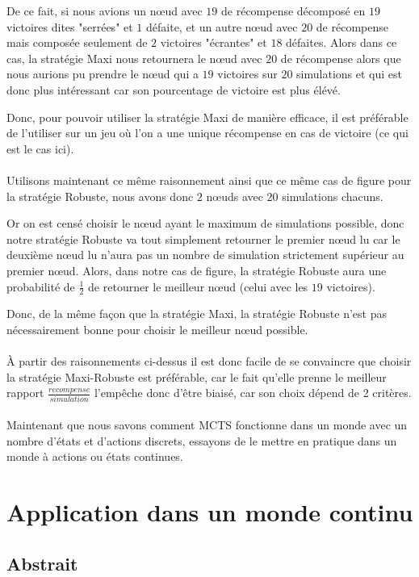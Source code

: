 \documentclass[pdftex,french, english]{article}	%
\begin{document}
De ce fait, si nous avions un nœud avec $19$ de récompense décomposé en $19$ victoires dites "serrées" et $1$ défaite, et un autre nœud avec $20$ de récompense mais composée seulement de $2$ victoires "écrantes" et $18$ défaites.
Alors dans ce cas, la stratégie Maxi nous retournera le nœud avec $20$ de récompense alors que nous aurions pu prendre le nœud qui a $19$ victoires sur $20$ simulations et qui est donc plus intéressant car son pourcentage de victoire est plus élévé.

Donc, pour pouvoir utiliser la stratégie Maxi de manière efficace, il est préférable de l'utiliser sur un jeu où l'on a une unique récompense en cas de victoire (ce qui est le cas ici).
\\ \\
Utilisons maintenant ce même raisonnement ainsi que ce même cas de figure pour la stratégie Robuste, nous avons donc $2$ nœuds avec $20$ simulations chacuns. 

Or on est censé choisir le nœud ayant le maximum de simulations possible, donc notre stratégie Robuste va tout simplement retourner le premier nœud lu car le deuxième nœud lu n'aura pas un nombre de simulation strictement supérieur au premier nœud. Alors, dans notre cas de figure, la stratégie Robuste aura une probabilité de $\frac{1}{2}$ de retourner le meilleur nœud (celui avec les $19$ victoires).

Donc, de la même façon que la stratégie Maxi, la stratégie Robuste n'est pas nécessairement bonne pour choisir le meilleur nœud possible.
\\ \\
À partir des raisonnements ci-dessus il est donc facile de se convaincre que choisir la stratégie Maxi-Robuste est préférable, car le fait qu'elle prenne le meilleur rapport $\frac{recompense}{simulation}$ l'empêche donc d'être biaisé, car son choix dépend de 2 critères.
\\ \\
Maintenant que nous savons comment MCTS fonctionne dans un monde avec un nombre d'états et d'actions discrets, essayons de le mettre en pratique dans un monde à actions ou états continues.

\newpage
\section{Application dans un monde continu}
\subsection{Abstrait}
\end{document}
